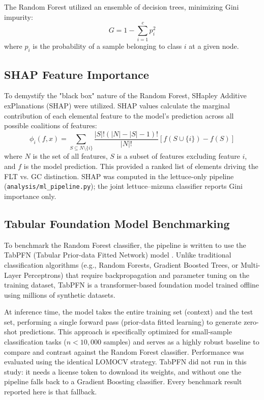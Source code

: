The Random Forest utilized an ensemble of decision trees, minimizing Gini impurity:
\begin{equation}
G = 1 - \sum_{i=1}^{c} p_i^2
\end{equation}
where $p_i$ is the probability of a sample belonging to class $i$ at a given node.

\subsection{SHAP Feature Importance}
To demystify the "black box" nature of the Random Forest, SHapley Additive exPlanations (SHAP) \cite{lundberg2017} were utilized. SHAP values calculate the marginal contribution of each elemental feature to the model's prediction across all possible coalitions of features:
\begin{equation}
\phi_i(f, x) = \sum_{S \subseteq N \setminus \{i\}} \frac{|S|!(|N| - |S| - 1)!}{|N|!} \left[ f(S \cup \{i\}) - f(S) \right]
\end{equation}
where $N$ is the set of all features, $S$ is a subset of features excluding feature $i$, and $f$ is the model prediction. This provided a ranked list of elements driving the FLT vs. GC distinction. SHAP was computed in the lettuce-only pipeline (\texttt{analysis/ml\_pipeline.py}); the joint lettuce--mizuna classifier reports Gini importance only.

\subsection{Tabular Foundation Model Benchmarking}
To benchmark the Random Forest classifier, the pipeline is written to use the TabPFN (Tabular Prior-data Fitted Network) model \cite{hollmann2025}. Unlike traditional classification algorithms (e.g., Random Forests, Gradient Boosted Trees, or Multi-Layer Perceptrons) that require backpropagation and parameter tuning on the training dataset, TabPFN is a transformer-based foundation model trained offline using millions of synthetic datasets. 

At inference time, the model takes the entire training set (context) and the test set, performing a single forward pass (prior-data fitted learning) to generate zero-shot predictions. This approach is specifically optimized for small-sample classification tasks ($n < 10,000$ samples) and serves as a highly robust baseline to compare and contrast against the Random Forest classifier. Performance was evaluated using the identical LOMOCV strategy. TabPFN did not run in this study: it needs a license token to download its weights, and without one the pipeline falls back to a Gradient Boosting classifier. Every benchmark result reported here is that fallback.

